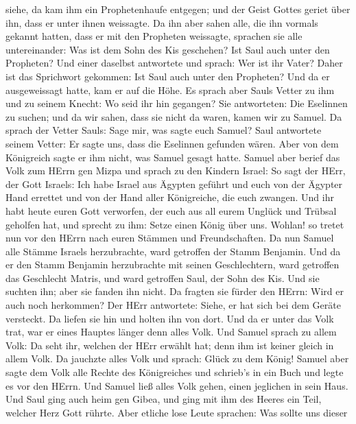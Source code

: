 siehe, da kam ihm ein Prophetenhaufe entgegen; und der Geist Gottes
geriet über ihn, dass er unter ihnen weissagte.  Da ihn
aber sahen alle, die ihn vormals gekannt hatten, dass er mit den
Propheten weissagte, sprachen sie alle untereinander: Was ist dem Sohn
des Kis geschehen? Ist Saul auch unter den Propheten?  Und
einer daselbst antwortete und sprach: Wer ist ihr Vater? Daher ist das
Sprichwort gekommen: Ist Saul auch unter den Propheten? 
Und da er ausgeweissagt hatte, kam er auf die Höhe.  Es
sprach aber Sauls Vetter zu ihm und zu seinem Knecht: Wo seid ihr hin
gegangen? Sie antworteten: Die Eselinnen zu suchen; und da wir sahen,
dass sie nicht da waren, kamen wir zu Samuel.  Da sprach
der Vetter Sauls: Sage mir, was sagte euch Samuel?  Saul
antwortete seinem Vetter: Er sagte uns, dass die Eselinnen gefunden
wären. Aber von dem Königreich sagte er ihm nicht, was Samuel gesagt
hatte.  Samuel aber berief das Volk zum HErrn gen Mizpa
 und sprach zu den Kindern Israel: So sagt der HErr, der
Gott Israels: Ich habe Israel aus Ägypten geführt und euch von der
Ägypter Hand errettet und von der Hand aller Königreiche, die euch
zwangen.  Und ihr habt heute euren Gott verworfen, der euch
aus all eurem Unglück und Trübsal geholfen hat, und sprecht zu ihm:
Setze einen König über uns. Wohlan! so tretet nun vor den HErrn nach
euren Stämmen und Freundschaften.  Da nun Samuel alle
Stämme Israels herzubrachte, ward getroffen der Stamm Benjamin.
 Und da er den Stamm Benjamin herzubrachte mit seinen
Geschlechtern, ward getroffen das Geschlecht Matris, und ward getroffen
Saul, der Sohn des Kis. Und sie suchten ihn; aber sie fanden ihn nicht.
 Da fragten sie fürder den HErrn: Wird er auch noch
herkommen? Der HErr antwortete: Siehe, er hat sich bei dem Geräte
versteckt.  Da liefen sie hin und holten ihn von dort. Und
da er unter das Volk trat, war er eines Hauptes länger denn alles Volk.
 Und Samuel sprach zu allem Volk: Da seht ihr, welchen der
HErr erwählt hat; denn ihm ist keiner gleich in allem Volk. Da jauchzte
alles Volk und sprach: Glück zu dem König!  Samuel aber
sagte dem Volk alle Rechte des Königreiches und schrieb's in ein Buch
und legte es vor den HErrn. Und Samuel ließ alles Volk gehen, einen
jeglichen in sein Haus.  Und Saul ging auch heim gen Gibea,
und ging mit ihm des Heeres ein Teil, welcher Herz Gott rührte.
 Aber etliche lose Leute sprachen: Was sollte uns dieser
